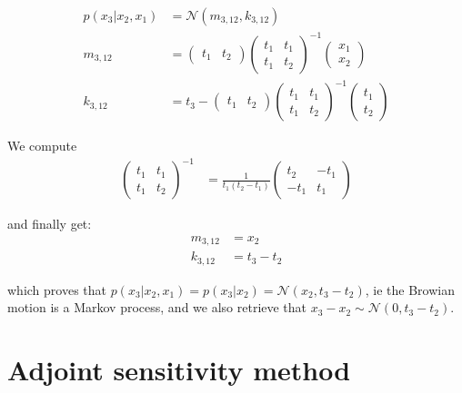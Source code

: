 \begin{align}
    p(x_3 \vert x_2, x_1) &= \mathcal{N}(m_{3,12}, k_{3,12}) \\
    m_{3,12} &= \begin{pmatrix}
        t_1 & t_2
    \end{pmatrix}
    \begin{pmatrix}
        t_1 & t_1 \\
        t_1 & t_2
    \end{pmatrix}^{-1}
    \begin{pmatrix}
        x_1 \\ x_2
    \end{pmatrix} \\
    k_{3,12} &= t_3 - \begin{pmatrix}
        t_1 & t_2
    \end{pmatrix}
    \begin{pmatrix}
        t_1 & t_1 \\
        t_1 & t_2
    \end{pmatrix}^{-1}
    \begin{pmatrix}
        t_1 \\ t_2
    \end{pmatrix}
\end{align}

We compute
\begin{align}
    \begin{pmatrix}
        t_1 & t_1 \\
        t_1 & t_2
    \end{pmatrix}^{-1} &= \frac{1}{t_1(t_2 - t_1)}
    \begin{pmatrix}
        t_2 & -t_1 \\
        -t_1 & t_1
    \end{pmatrix}
\end{align}

and finally get:
\begin{align}
    m_{3,12} &= x_2 \\
    k_{3,12} &= t_3 - t_2
\end{align}

which proves that $p(x_3 \vert x_2, x_1) = p(x_3 \vert x_2) = \mathcal{N}(x_2, t_3-t_2)$, ie the Browian motion is a Markov process,
and we also retrieve that $x_3 - x_2 \sim \mathcal{N}(0, t_3-t_2)$.

\chapter{Adjoint sensitivity method}\label{sec:adjoint_sensitivity_method}

